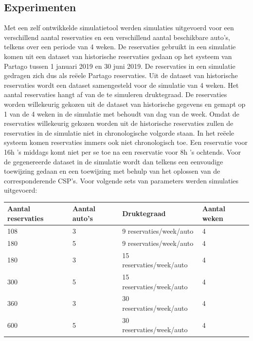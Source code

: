 \documentclass[a0,portrait]{a0poster}
\begin{document}
\begin{multicols}{2}
\color{Black} %
\color{HoGentAccent1} 
\section*{Experimenten}
\color{black}
Met een zelf ontwikkelde simulatietool werden simulaties uitgevoerd voor een verschillend aantal reservaties en een verschillend aantal beschikbare auto's, telkens over een periode van 4 weken. De reservaties gebruikt in een simulatie komen uit een dataset van historische reservaties gedaan op het systeem van Partago tussen 1 januari 2019 en 30 juni 2019. De reservaties in een simulatie gedragen zich dus als reëele Partago reservaties. Uit de dataset van historische reservaties wordt een dataset samengesteld voor de simulatie van 4 weken. Het aantal reservaties hangt af van de te simuleren druktegraad. De reservaties worden willekeurig gekozen uit de dataset van historische gegevens en gemapt op 1 van de 4 weken in de simulatie met behoudt van dag van de week. Omdat de reservaties willekeurig gekozen worden uit de historische reservaties zullen de reservaties in de simulatie niet in chronologische volgorde staan. In het reëele systeem komen reservaties immers ook niet chronologisch toe. Een reservatie voor 16h 's middags komt niet per se toe na een reservatie voor 8h 's ochtends. Voor de gegenereerde dataset in de simulatie wordt dan telkens een eenvoudige toewijzing gedaan en een toewijzing met behulp van het oplossen van de corresponderende CSP's. Voor volgende sets van parameters werden simulaties uitgevoerd: 
\begin{center}
	\label{tab:parameters}
	\begin{tabular}{ | l | l | l | p{3cm} |}
		\hline
		Aantal reservaties & Aantal auto's & Druktegraad & Aantal weken \\ \hline
		108 & 3 & 9 reservaties/week/auto & 4 \\ \hline
		180 & 5 & 9 reservaties/week/auto & 4 \\ \hline
		180 & 3 & 15 reservaties/week/auto & 4 \\ \hline
		300 & 5 & 15 reservaties/week/auto & 4 \\ \hline
		360 & 3 & 30 reservaties/week/auto & 4 \\ \hline
		600 & 5 & 30 reservaties/week/auto & 4 \\ \hline
	\end{tabular}
\end{center} 


\end{multicols}
\end{document}
